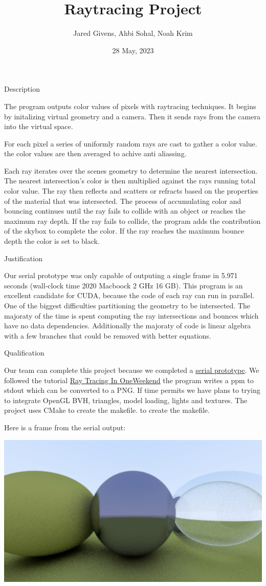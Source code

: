 \documentclass{article}
\title{Raytracing Project}
\author{Jared Givens, Ahbi Sohal, Noah Krim}
\date{28 May, 2023}
\begin{document}
\maketitle

\large
Description

\normalsize
The program outputs color values of pixels with raytracing techniques. 
It begins by initalizing virtual geometry and a camera. Then it sends rays from the camera 
into the virtual space. 

For each pixel a series of uniformly random rays are 
cast to gather a color value. the color values are then averaged to achive anti 
aliassing. 

Each ray iterates over the scenes geometry to determine the nearest 
intersection. The nearest intersection's color is then multiplied against the 
rays running total color value. The ray then reflects and scatters or refracts 
based on the properties of the material that was intersected. The process of 
accumulating color and bouncing continues until the ray fails to collide with 
an object or reaches the maximum ray depth. If the ray fails to collide, the 
program adds the contribution of the skybox to complete the color.  
If the ray reaches the 
maximum bounce depth the color is set to black.  

\large
Justification

\normalsize
Our serial prototype was only capable of outputing a single frame in 5.971 seconds
(wall-clock time 2020 Macboock 2 GHz 16 GB). This program is an excellent 
candidate for CUDA, because the code of each ray can run in parallel. One of the 
biggest difficulties partitioning the geometry to be intersected. 
The 
majoraty of the time is spent computing the ray intersections and bounces which 
have no data dependencies. Additionally the majoraty of code is linear algebra 
with a few branches that could be removed with better equations. 

\large
Qualification

\normalsize
Our team can complete this project because we completed a 
\href{https://github.com/JaredGivens/ECS158-Raytracing}{serial prototype}.
We followed the tutorial
\href{https://raytracing.github.io/books/RayTracingInOneWeekend.html}{Ray Tracing In OneWeekend}
the program writes a ppm to stdout which can be converted to a PNG.
If time permits we have plans to trying to integrate OpenGL BVH, triangles, model loading, lights
and textures.
The project uses CMake to create the makefile.
to create the makefile.



Here is a frame from the serial output:

\includegraphics[scale=0.5]{rtsc}
\end{document}
